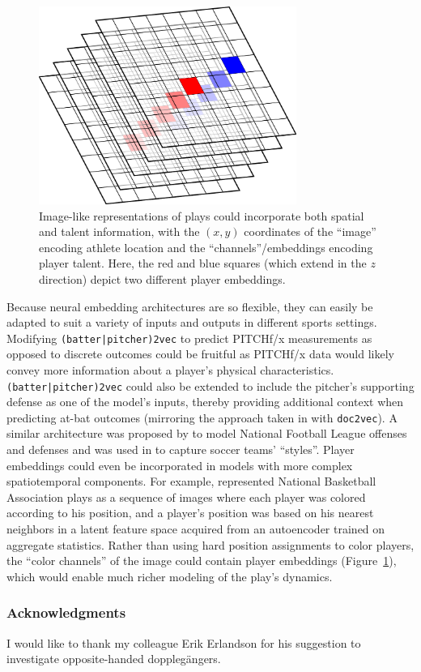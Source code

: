 \documentclass{article}
\begin{document}
\begin{figure}[h]
\centering
\includegraphics[width=0.75\textwidth,height=\textheight,keepaspectratio]{image_embedding.png}
\caption{Image-like representations of plays could incorporate both spatial and talent information, with the $(x, y)$ coordinates of the ``image'' encoding athlete location and the ``channels''/embeddings encoding player talent. Here, the red and blue squares (which extend in the $z$ direction) depict two different player embeddings.}
\label{fig:image_embed}
\end{figure}

Because neural embedding architectures are so flexible, they can easily be adapted to suit a variety of inputs and outputs in different sports settings. Modifying \texttt{(batter|pitcher)2vec} to predict PITCHf/x measurements as opposed to discrete outcomes could be fruitful as PITCHf/x data would likely convey more information about a player's physical characteristics. \texttt{(batter|pitcher)2vec} could also be extended to include the pitcher's supporting defense as one of the model's inputs, thereby providing additional context when predicting at-bat outcomes (mirroring the approach taken in \parencite{Le2014} with \texttt{doc2vec}). A similar architecture was proposed by \parencite{Alcorn2016} to model National Football League offenses and defenses and was used in \parencite{Le2017} to capture soccer teams' ``styles''. Player embeddings could even be incorporated in models with more complex spatiotemporal components. For example, \parencite{Wang2016} represented National Basketball Association plays as a sequence of images where each player was colored according to his position, and a player's position was based on his nearest neighbors in a latent feature space acquired from an autoencoder trained on aggregate statistics. Rather than using hard position assignments to color players, the ``color channels'' of the image could contain player embeddings (Figure~\ref{fig:image_embed}), which would enable much richer modeling of the play's dynamics.

\subsubsection*{Acknowledgments}

I would like to thank my colleague Erik Erlandson for his suggestion to investigate opposite-handed dopplegängers.

\printbibliography
\end{document}
